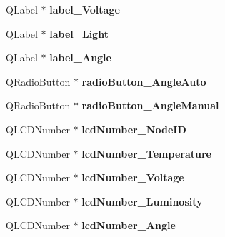 \begin{DoxyCompactItemize}
\item 
\mbox{\label{class_ui___main_window_a8da332817e38243e2b77c53961e53229}} 
Q\+Label $\ast$ {\bfseries label\+\_\+\+Voltage}
\item 
\mbox{\label{class_ui___main_window_a8efeaf25638e59ba66275711ff03c697}} 
Q\+Label $\ast$ {\bfseries label\+\_\+\+Light}
\item 
\mbox{\label{class_ui___main_window_af2de8755e4b3552829b428341419b031}} 
Q\+Label $\ast$ {\bfseries label\+\_\+\+Angle}
\item 
\mbox{\label{class_ui___main_window_aa2c9d885dd5c21cd18158e3dfd02359f}} 
Q\+Radio\+Button $\ast$ {\bfseries radio\+Button\+\_\+\+Angle\+Auto}
\item 
\mbox{\label{class_ui___main_window_a66b1e9484c19f44d26b9d71fdd48e6e5}} 
Q\+Radio\+Button $\ast$ {\bfseries radio\+Button\+\_\+\+Angle\+Manual}
\item 
\mbox{\label{class_ui___main_window_ae6de8abee8826335999b7daea875a413}} 
Q\+L\+C\+D\+Number $\ast$ {\bfseries lcd\+Number\+\_\+\+Node\+ID}
\item 
\mbox{\label{class_ui___main_window_ac67b2f32f7e7e92b1bbb1c5a76f75a78}} 
Q\+L\+C\+D\+Number $\ast$ {\bfseries lcd\+Number\+\_\+\+Temperature}
\item 
\mbox{\label{class_ui___main_window_a3757c80673a51dd1a7e69f7a9ce62c06}} 
Q\+L\+C\+D\+Number $\ast$ {\bfseries lcd\+Number\+\_\+\+Voltage}
\item 
\mbox{\label{class_ui___main_window_a77251b1eee8a6928b23b965fa00c51ae}} 
Q\+L\+C\+D\+Number $\ast$ {\bfseries lcd\+Number\+\_\+\+Luminosity}
\item 
\mbox{\label{class_ui___main_window_ae994b50bb8c8d3f146aba0db0d889d95}} 
Q\+L\+C\+D\+Number $\ast$ {\bfseries lcd\+Number\+\_\+\+Angle}
\item 
\mbox{\label{class_ui___main_window_a2020cd37debed3465886f3a2c9e9154b}} 

\end{DoxyCompactItemize}

